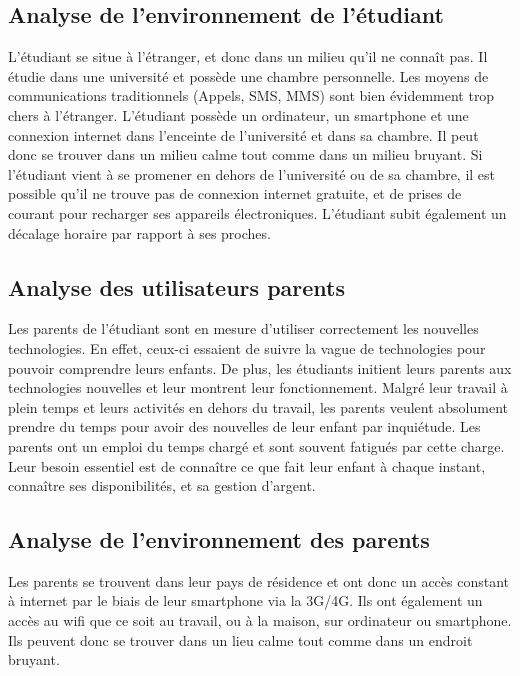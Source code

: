 \documentclass[12pt]{article}
\begin{document}
\subsection{Analyse de l’environnement de l’étudiant}

L’étudiant se situe à l’étranger, et donc dans un milieu qu’il ne connaît pas. Il étudie dans une université et possède une chambre personnelle. Les moyens de communications traditionnels (Appels, SMS, MMS) sont bien évidemment trop chers à l’étranger.  L’étudiant possède un ordinateur, un smartphone et une connexion internet dans l’enceinte de l’université et dans sa chambre. Il peut donc se trouver dans un milieu calme tout comme dans un milieu bruyant. Si l’étudiant vient à se promener en dehors de l’université ou de sa chambre, il est possible qu’il ne trouve pas de connexion internet gratuite, et de prises de courant pour recharger ses appareils électroniques. L’étudiant subit également un décalage horaire par rapport à ses proches.

\subsection{Analyse des utilisateurs parents}

Les parents de l’étudiant sont en mesure d’utiliser correctement les nouvelles technologies. En effet, ceux-ci essaient de suivre la vague de technologies pour pouvoir comprendre leurs enfants. De plus, les étudiants initient leurs parents aux technologies nouvelles et leur montrent leur fonctionnement. Malgré leur travail à plein temps et leurs activités en dehors du travail, les parents  veulent absolument prendre du temps pour avoir des nouvelles de leur enfant par inquiétude. Les parents ont un emploi du temps chargé et sont souvent fatigués par cette charge. Leur besoin essentiel est de connaître ce que fait leur enfant à chaque instant, connaître ses disponibilités, et sa gestion d'argent.

\subsection{Analyse de l’environnement des parents}

Les parents se trouvent dans leur pays de résidence et ont donc un accès constant à internet par le biais de leur smartphone via la 3G/4G. Ils ont également un accès au wifi que ce soit au travail, ou à la maison, sur ordinateur ou smartphone. Ils peuvent donc se trouver dans un lieu calme tout comme dans un endroit bruyant.
\end{document}
